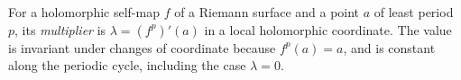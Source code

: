 
For a holomorphic self-map $f$ of a Riemann surface and a point $a$ of least period $p$, its \emph{multiplier} is $\lambda=(f^p)'(a)$ in a local holomorphic coordinate. The value is invariant under changes of coordinate because $f^p(a)=a$, and is constant along the periodic cycle, including the case $\lambda=0$.
